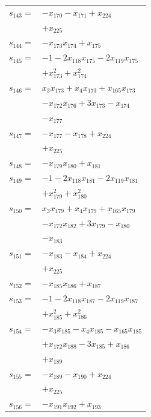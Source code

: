 \begin{longtable}{@{}r@{\;}l@{}}
\(s_{143}=\) & \(\displaystyle -x_{170} -x_{171} +x_{224}\) \\
 & \(\displaystyle +x_{225}\) \\[3pt]
\(s_{144}=\) & \(\displaystyle -x_{173}x_{174} +x_{175}\) \\[3pt]
\(s_{145}=\) & \(\displaystyle -1 -2x_{118}x_{175} -2x_{119}x_{175}\) \\
 & \(\displaystyle +x_{173}^{2} +x_{174}^{2}\) \\[3pt]
\(s_{146}=\) & \(\displaystyle x_{3}x_{173} +x_{4}x_{173} +x_{165}x_{173}\) \\
 & \(\displaystyle -x_{172}x_{176} +3x_{173} -x_{174}\) \\
 & \(\displaystyle -x_{177}\) \\[3pt]
\(s_{147}=\) & \(\displaystyle -x_{177} -x_{178} +x_{224}\) \\
 & \(\displaystyle +x_{225}\) \\[3pt]
\(s_{148}=\) & \(\displaystyle -x_{179}x_{180} +x_{181}\) \\[3pt]
\(s_{149}=\) & \(\displaystyle -1 -2x_{118}x_{181} -2x_{119}x_{181}\) \\
 & \(\displaystyle +x_{179}^{2} +x_{180}^{2}\) \\[3pt]
\(s_{150}=\) & \(\displaystyle x_{3}x_{179} +x_{4}x_{179} +x_{165}x_{179}\) \\
 & \(\displaystyle -x_{172}x_{182} +3x_{179} -x_{180}\) \\
 & \(\displaystyle -x_{183}\) \\[3pt]
\(s_{151}=\) & \(\displaystyle -x_{183} -x_{184} +x_{224}\) \\
 & \(\displaystyle +x_{225}\) \\[3pt]
\(s_{152}=\) & \(\displaystyle -x_{185}x_{186} +x_{187}\) \\[3pt]
\(s_{153}=\) & \(\displaystyle -1 -2x_{118}x_{187} -2x_{119}x_{187}\) \\
 & \(\displaystyle +x_{185}^{2} +x_{186}^{2}\) \\[3pt]
\(s_{154}=\) & \(\displaystyle -x_{3}x_{185} -x_{4}x_{185} -x_{165}x_{185}\) \\
 & \(\displaystyle +x_{172}x_{188} -3x_{185} +x_{186}\) \\
 & \(\displaystyle +x_{189}\) \\[3pt]
\(s_{155}=\) & \(\displaystyle -x_{189} -x_{190} +x_{224}\) \\
 & \(\displaystyle +x_{225}\) \\[3pt]
\(s_{156}=\) & \(\displaystyle -x_{191}x_{192} +x_{193}\) \\[3pt]

\end{longtable}
